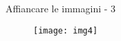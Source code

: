 \begin{frame}{Affiancare le immagini - 3}

\begin{figure}[H]
	\centering
	\texttt{[image: img4]}
\end{figure}

\end{frame}